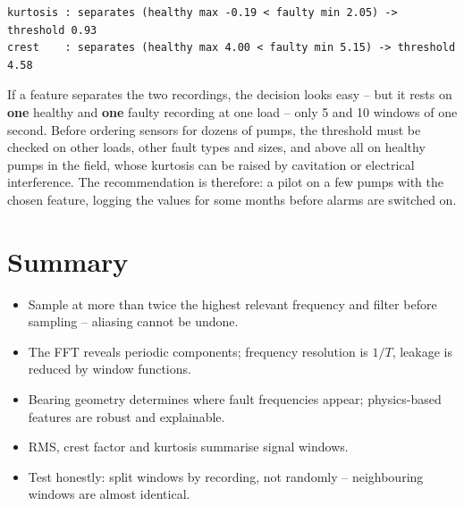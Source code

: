 \documentclass[
  letterpaper,
  DIV=11,
  numbers=noendperiod]{scrreprt}
\providecommand{\tightlist}{%
  \setlength{\itemsep}{0pt}\setlength{\parskip}{0pt}}\usepackage{longtable,booktabs,array}
\begin{document}
\begin{verbatim}
kurtosis : separates (healthy max -0.19 < faulty min 2.05) -> threshold 0.93
crest    : separates (healthy max 4.00 < faulty min 5.15) -> threshold 4.58
\end{verbatim}

If a feature separates the two recordings, the decision looks easy --
but it rests on \textbf{one} healthy and \textbf{one} faulty recording
at one load -- only 5 and 10 windows of one second. Before ordering
sensors for dozens of pumps, the threshold must be checked on other
loads, other fault types and sizes, and above all on healthy pumps in
the field, whose kurtosis can be raised by cavitation or electrical
interference. The recommendation is therefore: a pilot on a few pumps
with the chosen feature, logging the values for some months before
alarms are switched on.

\section{Summary}\label{summary-10}

\begin{tcolorbox}[enhanced jigsaw, left=2mm, title=\textcolor{quarto-callout-important-color}{\faExclamation}\hspace{0.5em}{Key takeaways}, opacityback=0, breakable, rightrule=.15mm, arc=.35mm, toptitle=1mm, colbacktitle=quarto-callout-important-color!10!white, opacitybacktitle=0.6, coltitle=black, colframe=quarto-callout-important-color-frame, bottomrule=.15mm, leftrule=.75mm, bottomtitle=1mm, titlerule=0mm, toprule=.15mm, colback=white]

\begin{itemize}
\tightlist
\item
  Sample at more than twice the highest relevant frequency and filter
  before sampling -- aliasing cannot be undone.
\item
  The FFT reveals periodic components; frequency resolution is \(1/T\),
  leakage is reduced by window functions.
\item
  Bearing geometry determines where fault frequencies appear;
  physics-based features are robust and explainable.
\item
  RMS, crest factor and kurtosis summarise signal windows.
\item
  Test honestly: split windows by recording, not randomly --
  neighbouring windows are almost identical.
\end{itemize}

\end{tcolorbox}
\end{document}
